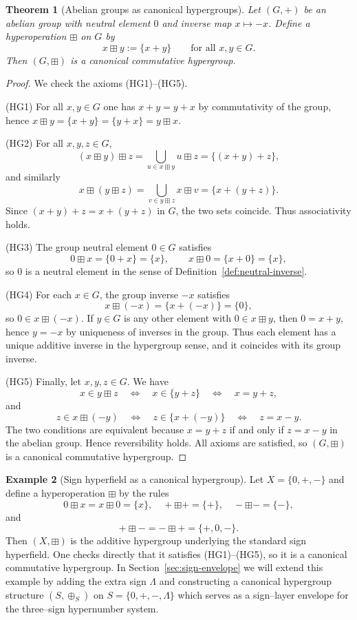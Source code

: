 \documentclass[11pt]{amsart}
\numberwithin{equation}{section}
\newtheorem{theorem}{Theorem}[section]
\theoremstyle{definition}
\newtheorem{example}[theorem]{Example}
\theoremstyle{remark}
\newcommand{\Sset}{S}                      %
\newcommand{\sop}{\oplus_S}                %
\begin{document}
\begin{theorem}[Abelian groups as canonical hypergroups]\label{thm:group-hypergroup}
Let $(G,+)$ be an abelian group with neutral element $0$ and inverse
map $x\mapsto-x$.  Define a hyperoperation $\boxplus$ on $G$ by
\[
  x\boxplus y := \{x+y\}
  \qquad\text{for all }x,y\in G.
\]
Then $(G,\boxplus)$ is a canonical commutative hypergroup.
\end{theorem}

\begin{proof}
We check the axioms (HG1)--(HG5).

(HG1) For all $x,y\in G$ one has $x+y=y+x$ by commutativity of the
group, hence $x\boxplus y=\{x+y\}=\{y+x\}=y\boxplus x$.

(HG2) For all $x,y,z\in G$,
\[
  (x\boxplus y)\boxplus z
  = \bigcup_{u\in x\boxplus y} u\boxplus z
  = \{(x+y)+z\},
\]
and similarly
\[
  x\boxplus(y\boxplus z)
  = \bigcup_{v\in y\boxplus z} x\boxplus v
  = \{x+(y+z)\}.
\]
Since $(x+y)+z=x+(y+z)$ in $G$, the two sets coincide.  Thus
associativity holds.

(HG3) The group neutral element $0\in G$ satisfies
\[
  0\boxplus x = \{0+x\} = \{x\},
  \qquad
  x\boxplus 0 = \{x+0\} = \{x\},
\]
so $0$ is a neutral element in the sense of
Definition~\ref{def:neutral-inverse}.

(HG4) For each $x\in G$, the group inverse $-x$ satisfies
\[
  x\boxplus(-x) = \{x+(-x)\} = \{0\},
\]
so $0\in x\boxplus(-x)$.  If $y\in G$ is any other element with
$0\in x\boxplus y$, then $0=x+y$, hence $y=-x$ by uniqueness of
inverses in the group.  Thus each element has a unique additive
inverse in the hypergroup sense, and it coincides with its group
inverse.

(HG5) Finally, let $x,y,z\in G$.  We have
\[
  x\in y\boxplus z
  \quad\Longleftrightarrow\quad
  x\in\{y+z\}
  \quad\Longleftrightarrow\quad
  x=y+z,
\]
and
\[
  z\in x\boxplus(-y)
  \quad\Longleftrightarrow\quad
  z\in\{x+(-y)\}
  \quad\Longleftrightarrow\quad
  z=x-y.
\]
The two conditions are equivalent because $x=y+z$ if and only if
$z=x-y$ in the abelian group.  Hence reversibility holds.  All axioms
are satisfied, so $(G,\boxplus)$ is a canonical commutative hypergroup.
\end{proof}

\begin{example}[Sign hyperfield as a canonical hypergroup]\label{ex:sign-hyperfield}
Let $X=\{0,+,-\}$ and define a hyperoperation $\boxplus$ by the rules
\[
  0\boxplus x = x\boxplus 0 = \{x\},\quad
  +\boxplus + = \{+\},\quad
  -\boxplus - = \{-\},
\]
and
\[
  +\boxplus - = -\boxplus +
  = \{+,0,-\}.
\]
Then $(X,\boxplus)$ is the additive hypergroup underlying the standard
sign hyperfield.  One checks directly that it satisfies
(HG1)--(HG5), so it is a canonical commutative hypergroup.  In
Section~\ref{sec:sign-envelope} we will extend this example by adding
the extra sign $\Lambda$ and constructing a canonical hypergroup
structure $(\Sset,\sop)$ on $\Sset=\{0,+,-,\Lambda\}$ which serves as a
sign--layer envelope for the three--sign hypernumber system.
\end{example}
\end{document}

